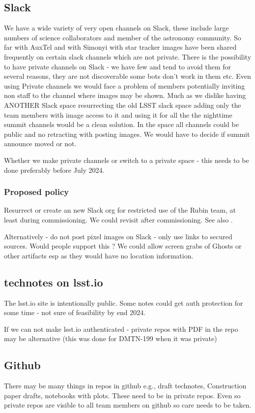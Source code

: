 \subsection{Slack}
We have a wide variety of very open channels on Slack, these include large numbers of science collaborators and member of the astronomy community.
So far with AuxTel and with Simonyi with star tracker images have been shared frequently on certain slack channels which are not private.
There is the possibility to have private channels on Slack - we have few and tend to avoid them for several reasons, they are not discoverable some bots don't work in them etc.
Even using Private channels we would face a problem of members potentially inviting non staff to the channel where images may be shown.
Much as we dislike having ANOTHER Slack space resurrecting the old LSST slack space adding only the team members with image access to it and using it for all the the nighttime summit channels would be a clean solution.
In the space all channels could be public and no retracting with posting images.
We would have to decide if summit announce moved or not.

Whether we make private channels or switch to a private space - this needs to be done preferably before July 2024.
\subsubsection{Proposed policy}
Resurrect or create an new Slack org for restricted use of the Rubin team, at least during commissioning.
We could revisit after commissioning.
See also .

Alternatively - do not post pixel images on Slack - only use links to secured sources.
Would people support this ? We could allow screen grabs of Ghosts or other artifacts esp as they would have no location information.

\subsection{technotes on lsst.io}
The lsst.io site is intentionally public.
Some notes could get auth protection for some time - not sure of feasibility by end 2024.

If we can not make lsst.io authenticated - private repos with PDF in the repo may be alternative (this was done for DMTN-199 when it was private)


\subsection{Github }
There may be many things in repos in github e.g., draft technotes, Construction paper drafts, notebooks with plots.
These need to be in private repos.
Even so private repos are visible to all team members on github so care needs to be taken.

